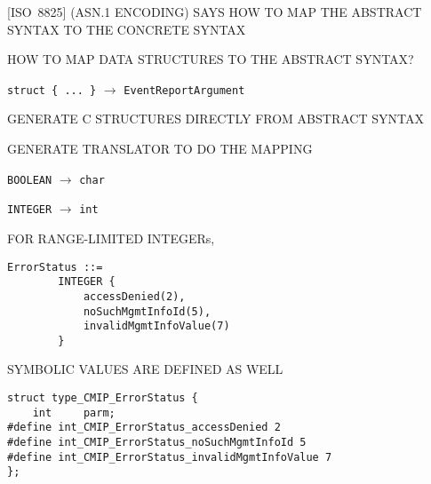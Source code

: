 \begin{bwslide}

\begin{nrtc}
\item	{}[ISO~8825] (ASN.1 ENCODING)
	SAYS HOW TO MAP THE ABSTRACT SYNTAX TO THE CONCRETE SYNTAX

\item	HOW TO MAP DATA STRUCTURES TO THE ABSTRACT SYNTAX?
    \begin{nrtc}
    \item	\verb"struct { ... }" $\rightarrow$ \verb"EventReportArgument"
    \end{nrtc}
\end{nrtc}
\end{bwslide}


\begin{bwslide}

\begin{nrtc}
\item	GENERATE C STRUCTURES DIRECTLY FROM ABSTRACT SYNTAX

\item	GENERATE TRANSLATOR TO DO THE MAPPING
\end{nrtc}
\end{bwslide}


\begin{bwslide}

\begin{nrtc}
\item	\verb"BOOLEAN" $\rightarrow$ \verb"char"

\item	\verb"INTEGER" $\rightarrow$ \verb"int"
\end{nrtc}
\end{bwslide}


\begin{bwslide}

\begin{nrtc}
\item	FOR RANGE-LIMITED INTEGERs,
\begin{verbatim}
ErrorStatus ::=
        INTEGER {
            accessDenied(2),
            noSuchMgmtInfoId(5),
            invalidMgmtInfoValue(7)
        }
\end{verbatim}

SYMBOLIC VALUES ARE DEFINED AS WELL
\begin{verbatim}
struct type_CMIP_ErrorStatus {
    int     parm;
#define	int_CMIP_ErrorStatus_accessDenied 2
#define	int_CMIP_ErrorStatus_noSuchMgmtInfoId 5
#define	int_CMIP_ErrorStatus_invalidMgmtInfoValue 7
};
\end{verbatim}
\end{nrtc}
\end{bwslide}


